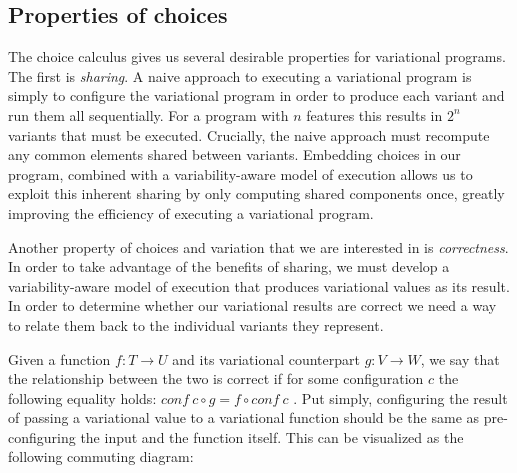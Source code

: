 \documentclass[letterpaper,10pt,onecolumn]{article}
\begin{document}
\subsection{Properties of choices}

The choice calculus gives us several desirable properties for variational programs.
The first is \emph{sharing}. A naive approach to executing a variational program is simply to
configure the variational program in order to produce each variant and run them all sequentially.
For a program with $n$ features this results in $2^n$ variants that must be executed. Crucially,
the naive approach must recompute any common elements shared between variants. Embedding
choices in our program, combined with a variability-aware model of execution allows us to exploit this
inherent sharing by only computing shared components once, greatly improving the efficiency of
executing a variational program.

Another property of choices and variation that we are interested in is \emph{correctness}. In order
to take advantage of the benefits of sharing, we must develop a variability-aware model of execution
that produces variational values as its result. In order to determine whether our variational results
are correct we need a way to relate them back to the individual variants they represent.

Given a function $f : T \rightarrow U$ and its variational counterpart $g : V \rightarrow W$, we say that
the relationship between the two is correct if for some configuration $c$ the following equality holds:
$\mathit{conf}\ c \circ g = f \circ \mathit{conf}\ c$ \cite{hubbard2016formula}. Put simply, configuring the result
of passing a variational value to a variational function should be the same as pre-configuring the input
and the function itself. This can be visualized as the following commuting diagram:

\begin{center}
\end{center}
\end{document}
